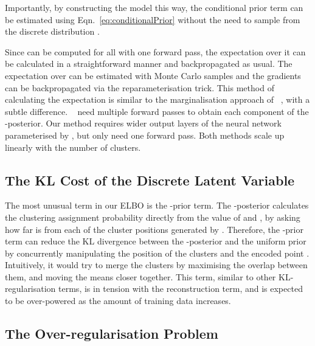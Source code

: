\documentclass{article} \usepackage{iclr2017_conference,times}
\begin{document}
Importantly, by constructing the model this way, the conditional prior term can be estimated using Eqn.~\ref{eq:conditionalPrior} without the need to sample from the discrete distribution .


Since  can be computed for all  with one forward pass, the expectation over it can be calculated in a straightforward manner and backpropagated as usual. The expectation over  can be estimated with  Monte Carlo samples and the gradients can be backpropagated via the reparameterisation trick. This method of calculating the expectation is similar to the marginalisation approach of ~\cite{kingma2014semi}, with a subtle difference. ~\cite{kingma2014semi} need multiple forward passes to obtain each component of the -posterior. Our method requires wider output layers of the neural network parameterised by , but only need one forward pass. Both methods scale up linearly with the number of clusters.




\subsection{The KL Cost of the Discrete Latent Variable}

The most unusual term in our ELBO is the -prior term. The -posterior calculates the clustering assignment probability directly from the value of  and , by asking how far  is from each of the cluster positions generated by . Therefore, the -prior term can reduce the KL divergence between the -posterior and the uniform prior by concurrently manipulating the position of the clusters and the encoded point . Intuitively, it would try to merge the clusters by maximising the overlap between them, and moving the means closer together. This term, similar to other KL-regularisation terms, is in tension with the reconstruction term, and is expected to be over-powered as the amount of training data increases.

\subsection{The Over-regularisation Problem}
\end{document}

